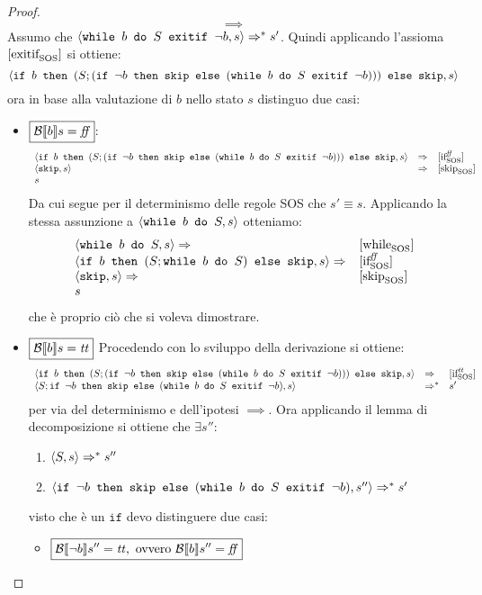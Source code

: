 \begin{enumerate}
\begin{proof}
$$
\boxed{\implies}
$$
Assumo che $\confSs{\wbSE{b}{S}{\neg b}}{s} \Rar{*} s'$.
Quindi applicando l'assioma $\exitifSOS$ si ottiene:
$$
\confSs{\ifABC{b}{(S; (\ifABC{\neg b}{\skipForFriends}{(\wbSE{b}{S}{\neg b})}))}{\skipForFriends}}{s}
$$
ora in base alla valutazione di $b$ nello stato $s$ distinguo due casi:
\begin{itemize}
	\item $\boxed{\B{b} = \semfalse}$:
	$$
	\begin{array}{lll}
	\confSs{\ifABC{b}{(S; (\ifABC{\neg b}{\skipForFriends}{(\wbSE{b}{S}{\neg b})}))}{\skipForFriends}}{s} & \Rar{} & \ifffSOS \\
	\confSs{\skipForFriends}{s} & \Rar{}& \skipSOS \\
	s
	\end{array}
	$$
	Da cui segue per il determinismo delle regole SOS che $s' \equiv s$.
	Applicando la stessa assunzione a $\confSs{\wbS{b}{S}}{s}$ otteniamo:
	$$
	\begin{array}{ll}
	\confSs{\wbS{b}{S}}{s} \Rar{}& \whileSOS \\
	\confSs{\ifABC{b}{(S; \wbS{b}{S})}{\skipForFriends}}{s} \Rar{} & \ifffSOS \\ 
	\confSs{\skipForFriends}{s} \Rar{}& \skipSOS \\
	s
	\end{array}
	$$
	che è proprio ciò che si voleva dimostrare.
	\item $\boxed{\B{b} = \semtrue}$
	Procedendo con lo sviluppo della derivazione si ottiene:
	$$
	\begin{array}{lll}
	\confSs{\ifABC{b}{(S; (\ifABC{\neg b}{\skipForFriends}{(\wbSE{b}{S}{\neg b})}))}{\skipForFriends}}{s} & \Rar{} & \ifttSOS \\
	\confSs{S; \ifABC{\neg b}{\skipForFriends}{(\wbSE{b}{S}{\neg b})}}{s} & \Rar{*} & s'\\
	\end{array}
	$$
	per via del determinismo e dell'ipotesi $\implies$.
	Ora applicando il lemma di decomposizione si ottiene che $\exists s''$:
	\begin{enumerate}
	\item $\confSs{S}{s} \Rar{*} s''$
	\label{hw6:Ssgoestos''}
	\item $\confSs{\ifABC{\neg b}{\skipForFriends}{(\wbSE{b}{S}{\neg b})}}{s''} \Rar{*} s'$
	\label{hw6:ifnegb}
	\end{enumerate}
	visto che è un $\texttt{if}$ devo distinguere due casi:
	\begin{itemize}
		\item $\boxed{\B{\neg b}'' = \semtrue, \text{ ovvero } \B{b}'' = \semfalse}$

\end{itemize}
\end{itemize}
\end{proof}
\end{enumerate}

